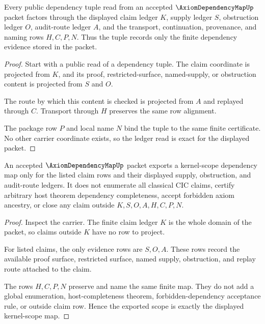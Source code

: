 \begin{theorem}
\label{thm:axiom-dependency-map-ledger-exactness}
Every public dependency tuple read from an accepted $\AxiomDependencyMapUp$ packet factors through the displayed claim ledger $K$, supply ledger $S$, obstruction ledger $O$, audit-route ledger $A$, and the transport, continuation, provenance, and naming rows $H,C,P,N$. Thus the tuple records only the finite dependency evidence stored in the packet.
\end{theorem}
\begin{proof}
Start with a public read of a dependency tuple. The claim coordinate is projected from $K$, and its proof, restricted-surface, named-supply, or obstruction content is projected from $S$ and $O$.

The route by which this content is checked is projected from $A$ and replayed through $C$. Transport through $H$ preserves the same row alignment.

The package row $P$ and local name $N$ bind the tuple to the same finite certificate. No other carrier coordinate exists, so the ledger read is exact for the displayed packet.
\end{proof}

\begin{theorem}
\label{thm:axiom-dependency-map-kernel-scope}
An accepted $\AxiomDependencyMapUp$ packet exports a kernel-scope dependency map only for the listed claim rows and their displayed supply, obstruction, and audit-route ledgers. It does not enumerate all classical CIC claims, certify arbitrary host theorem dependency completeness, accept forbidden axiom ancestry, or close any claim outside $K,S,O,A,H,C,P,N$.
\end{theorem}
\begin{proof}
Inspect the carrier. The finite claim ledger $K$ is the whole domain of the packet, so claims outside $K$ have no row to project.

For listed claims, the only evidence rows are $S,O,A$. These rows record the available proof surface, restricted surface, named supply, obstruction, and replay route attached to the claim.

The rows $H,C,P,N$ preserve and name the same finite map. They do not add a global enumeration, host-completeness theorem, forbidden-dependency acceptance rule, or outside claim row. Hence the exported scope is exactly the displayed kernel-scope map.
\end{proof}

